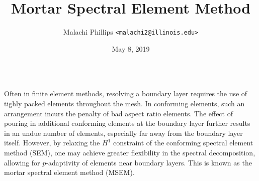\documentclass[final,t]{beamer}
\title{Mortar Spectral Element Method}
\author{Malachi Phillips \texttt{<malachi2@illinois.edu>}}
\institute{%
  Computer Science
  $\cdot$ University of Illinois
}
\date{May 8, 2019}
\begin{document}
\begin{frame}[fragile]{}
  \begin{columns}[t]


    \begin{column}{.45\linewidth}
      \begin{tcolorbox}[toplevelbox,adjusted title={Problem Statement}]
      Often in finite element methods, resolving a boundary layer requires
      the use of tighly packed elements throughout the mesh. In conforming
      elements, such an arrangement incurs the penalty of bad aspect ratio elements.
      The effect of pouring in additional conforming elements at the boundary layer
      further results in an undue number of elements, especially far away from the
      boundary layer itself. However, by relaxing the $H^1$ constraint of the
      conforming spectral element method (SEM), one may achieve greater flexibility
      in the spectral decomposition, allowing for $p$-adaptivity of elements near
      boundary layers. This is known as the mortar spectral element method (MSEM).
      \end{tcolorbox}

\end{column}
\end{columns}
\end{frame}
\end{document}
